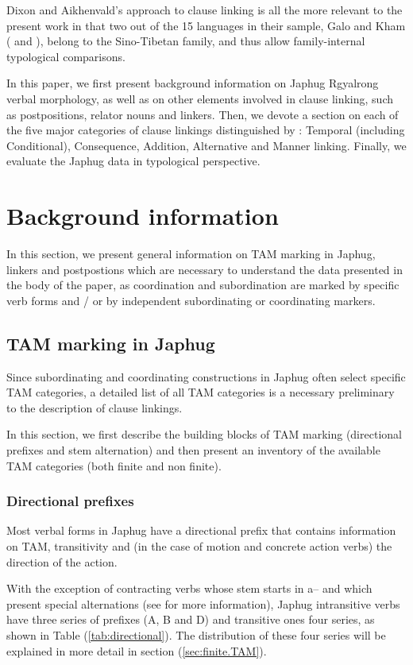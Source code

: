 \documentclass[oldfontcommands,oneside,a4paper,11pt]{article}
\newcommand{\ipa}[1]{{\phon \mbox{#1}}} %
\newcommand{\refb}[1]{(\ref{#1})}
\begin{document}
Dixon and Aikhenvald's approach to clause linking is all the more relevant to the present work in that two out of the 15 languages in their sample, Galo and Kham (\citealt{post09linking} and \citealt{watters09kham}), belong to the Sino-Tibetan family, and thus allow family-internal typological comparisons.

In this paper, we first present background information on Japhug Rgyalrong verbal morphology, as well as on other elements involved in clause linking, such as postpositions, relator nouns and linkers. Then, we devote a section on each of the five major categories of clause linkings distinguished by  \citet{dixon09intro}: Temporal (including Conditional), Consequence, Addition, Alternative and Manner linking. Finally, we evaluate the Japhug data in typological perspective.


\section{Background information}
In this section, we present general information on TAM marking in Japhug, linkers and postpostions which are necessary to understand the data presented in the body of the paper, as coordination and subordination are marked   by specific verb forms and / or by independent subordinating or coordinating markers.
 

\subsection{TAM marking in Japhug}
Since subordinating and coordinating constructions in Japhug often select specific TAM categories, a detailed list of all TAM categories is a necessary preliminary to the description of clause linkings.

In this section, we first  describe the building blocks of TAM marking (directional prefixes and stem alternation) and then present an inventory of the available TAM categories (both finite and non finite).

\subsubsection{Directional prefixes} \label{sec:directional}
Most verbal forms in Japhug have a directional prefix that contains information on TAM, transitivity and  (in the case of motion and concrete action verbs) the direction of the action.

With the exception of contracting verbs whose stem starts in \ipa{a--} and which present special alternations (see \citealt{jacques07passif} for more information), Japhug intransitive verbs have three series of prefixes (A, B and D) and transitive ones four series, as shown in Table \refb{tab:directional}. The distribution of these four series will be explained in more detail in section \refb{sec:finite.TAM}.
\end{document}
